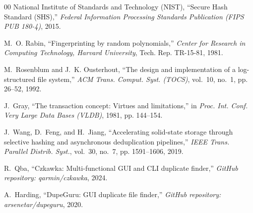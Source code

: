 \documentclass[journal,compsoc,10pt,twocolumn]{IEEEtran}
\begin{document}
\begin{thebibliography}{00}
National Institute of Standards and Technology (NIST), ``Secure Hash Standard (SHS),'' \emph{Federal Information Processing Standards Publication (FIPS PUB 180-4)}, 2015.

M.~O. Rabin, ``Fingerprinting by random polynomials,'' \emph{Center for Research in Computing Technology, Harvard University}, Tech. Rep. TR-15-81, 1981.

M.~Rosenblum and J.~K. Ousterhout, ``The design and implementation of a log-structured file system,'' \emph{ACM Trans. Comput. Syst. (TOCS)}, vol.~10, no.~1, pp. 26--52, 1992.

J.~Gray, ``The transaction concept: Virtues and limitations,'' in \emph{Proc. Int. Conf. Very Large Data Bases (VLDB)}, 1981, pp. 144--154.

J.~Wang, D.~Feng, and H.~Jiang, ``Accelerating solid-state storage through selective hashing and asynchronous deduplication pipelines,'' \emph{IEEE Trans. Parallel Distrib. Syst.}, vol.~30, no.~7, pp. 1591--1606, 2019.

R.~Qba, ``Czkawka: Multi-functional GUI and CLI duplicate finder,'' \emph{GitHub repository: qarmin/czkawka}, 2024.

A.~Harding, ``DupeGuru: GUI duplicate file finder,'' \emph{GitHub repository: arsenetar/dupeguru}, 2020.

\end{thebibliography}
\end{document}

